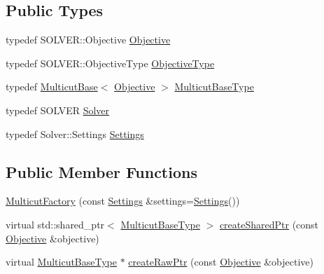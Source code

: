 \subsection*{Public Types}
\begin{DoxyCompactItemize}
\item 
typedef S\+O\+L\+V\+E\+R\+::\+Objective \hyperlink{classnifty_1_1graph_1_1optimization_1_1multicut_1_1MulticutFactory_a6025c285598b473f67aef9bb821f6a35}{Objective}
\item 
typedef S\+O\+L\+V\+E\+R\+::\+Objective\+Type \hyperlink{classnifty_1_1graph_1_1optimization_1_1multicut_1_1MulticutFactory_a8dbd5d6d65fab1f0cd111e277b70013c}{Objective\+Type}
\item 
typedef \hyperlink{classnifty_1_1graph_1_1optimization_1_1multicut_1_1MulticutBase}{Multicut\+Base}$<$ \hyperlink{classnifty_1_1graph_1_1optimization_1_1multicut_1_1MulticutFactory_a6025c285598b473f67aef9bb821f6a35}{Objective} $>$ \hyperlink{classnifty_1_1graph_1_1optimization_1_1multicut_1_1MulticutFactory_acea8cb02e38c540bb33953ad168fa4ad}{Multicut\+Base\+Type}
\item 
typedef S\+O\+L\+V\+E\+R \hyperlink{classnifty_1_1graph_1_1optimization_1_1multicut_1_1MulticutFactory_aeaf52672dd781d20a30a4ddc6b3f7ded}{Solver}
\item 
typedef Solver\+::\+Settings \hyperlink{classnifty_1_1graph_1_1optimization_1_1multicut_1_1MulticutFactory_a59e296190af4bb842b57a7e00fa27022}{Settings}
\end{DoxyCompactItemize}
\subsection*{Public Member Functions}
\begin{DoxyCompactItemize}
\item 
\hyperlink{classnifty_1_1graph_1_1optimization_1_1multicut_1_1MulticutFactory_ad747dc5e9b8e8dff5b63e634e74a7bb7}{Multicut\+Factory} (const \hyperlink{classnifty_1_1graph_1_1optimization_1_1multicut_1_1MulticutFactory_a59e296190af4bb842b57a7e00fa27022}{Settings} \&settings=\hyperlink{classnifty_1_1graph_1_1optimization_1_1multicut_1_1MulticutFactory_a59e296190af4bb842b57a7e00fa27022}{Settings}())
\item 
virtual std\+::shared\+\_\+ptr$<$ \hyperlink{classnifty_1_1graph_1_1optimization_1_1multicut_1_1MulticutFactory_acea8cb02e38c540bb33953ad168fa4ad}{Multicut\+Base\+Type} $>$ \hyperlink{classnifty_1_1graph_1_1optimization_1_1multicut_1_1MulticutFactory_a2f8df1eca821874854cc1fe3b1e0b97f}{create\+Shared\+Ptr} (const \hyperlink{classnifty_1_1graph_1_1optimization_1_1multicut_1_1MulticutFactory_a6025c285598b473f67aef9bb821f6a35}{Objective} \&objective)
\item 
virtual \hyperlink{classnifty_1_1graph_1_1optimization_1_1multicut_1_1MulticutFactory_acea8cb02e38c540bb33953ad168fa4ad}{Multicut\+Base\+Type} $\ast$ \hyperlink{classnifty_1_1graph_1_1optimization_1_1multicut_1_1MulticutFactory_a21c1a024973609917725bc544c276041}{create\+Raw\+Ptr} (const \hyperlink{classnifty_1_1graph_1_1optimization_1_1multicut_1_1MulticutFactory_a6025c285598b473f67aef9bb821f6a35}{Objective} \&objective)
\end{DoxyCompactItemize}


